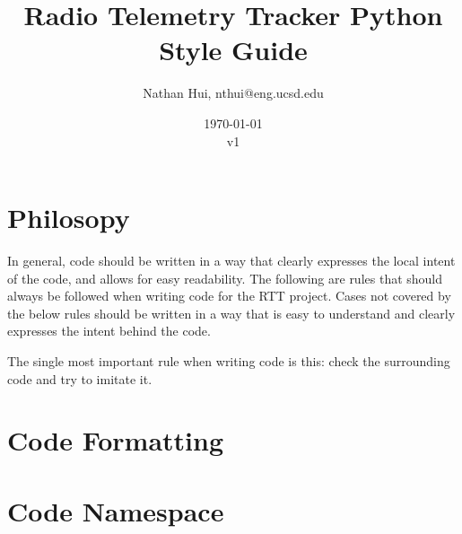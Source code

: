 \documentclass{article}
\title{Radio Telemetry Tracker Python Style Guide}
\author{Nathan Hui, nthui@eng.ucsd.edu}
\date{\today\\v1}
\begin{document}
\maketitle
\section{Philosopy}
In general, code should be written in a way that clearly expresses the local intent of the code, and allows for easy readability.  The following are rules that should always be followed when writing code for the RTT project.  Cases not covered by the below rules should be written in a way that is easy to understand and clearly expresses the intent behind the code.

The single most important rule when writing code is this: check the surrounding code and try to imitate it.
\section{Code Formatting}
\section{Code Namespace}
\end{document}
